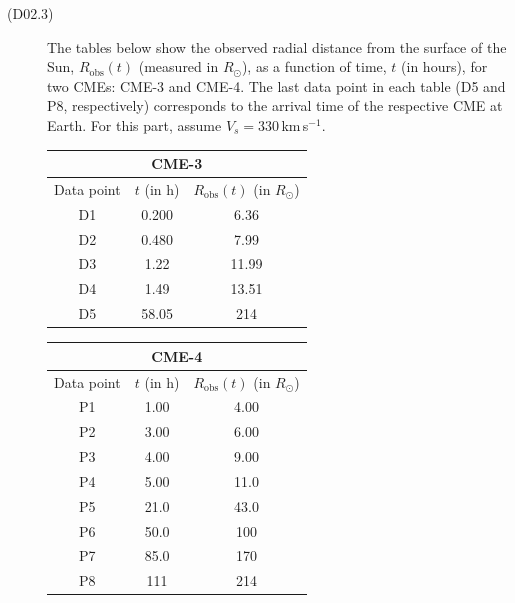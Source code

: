 \begin{description}
\item[(D02.3)] The tables below show the observed radial distance from the
  surface of the Sun, $R_{\mathrm{obs}}(t)$ (measured in $R_\odot$), as a
  function of time, $t$ (in hours), for two CMEs: CME-3 and CME-4. The last
  data point in each table (D5 and P8, respectively) corresponds to the
  arrival time of the respective CME at Earth. For this part, assume
  $V_s = 330$\,km\,s$^{-1}$.

  \begin{center}
  \begin{tabular}[t]{c c c}
  \multicolumn{3}{c}{CME-3}\\
  \toprule
  Data point & $t$ (in h) & $R_{\mathrm{obs}}(t)$ (in $R_\odot$)\\
  \midrule
  D1 & 0.200 & 6.36\\
  D2 & 0.480 & 7.99\\
  D3 & 1.22  & 11.99\\
  D4 & 1.49  & 13.51\\
  D5 & 58.05 & 214\\
  \bottomrule
  \end{tabular}
  \quad
  \begin{tabular}[t]{c c c}
  \multicolumn{3}{c}{CME-4}\\
  \toprule
  Data point & $t$ (in h) & $R_{\mathrm{obs}}(t)$ (in $R_\odot$)\\
  \midrule
  P1 & 1.00 & 4.00\\
  P2 & 3.00 & 6.00\\
  P3 & 4.00 & 9.00\\
  P4 & 5.00 & 11.0\\
  P5 & 21.0 & 43.0\\
  P6 & 50.0 & 100\\
  P7 & 85.0 & 170\\
  P8 & 111  & 214\\
  \bottomrule
  \end{tabular}
  \end{center}


\end{description}
